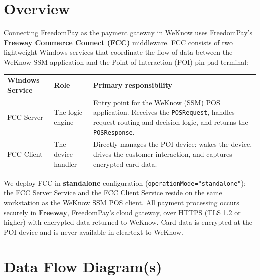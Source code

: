 \documentclass[a4paper,10pt]{article}
\begin{document}
\tableofcontents
\clearpage

\section{Overview}

Connecting FreedomPay as the payment gateway in WeKnow uses FreedomPay's
\textbf{Freeway Commerce Connect (FCC)} middleware. FCC consists of two
lightweight Windows services that coordinate the flow of data between the
WeKnow SSM application and the Point of Interaction (POI) pin-pad
terminal:

\begin{center}
\renewcommand{\arraystretch}{1.3}
\begin{tabularx}{\textwidth}{L{32mm} L{30mm} X}
\color{white}\textbf{Windows Service} &
\color{white}\textbf{Role} & \color{white}\textbf{Primary responsibility}\\
FCC Server & The logic engine &
Entry point for the WeKnow (SSM) POS application. Receives the
\texttt{POSRequest}, handles request routing and decision logic, and
returns the \texttt{POSResponse}.\\
FCC Client & The device handler &
Directly manages the POI device: wakes the device, drives the customer
interaction, and captures encrypted card data.\\
\end{tabularx}
\end{center}

We deploy FCC in \textbf{standalone} configuration
(\texttt{operationMode="standalone"}): the FCC Server Service and the FCC
Client Service reside on the same workstation as the WeKnow SSM POS
client. All payment processing occurs securely in \textbf{Freeway},
FreedomPay's cloud gateway, over HTTPS (TLS 1.2 or higher) with encrypted
data returned to WeKnow. Card data is encrypted at the POI device and is
never available in cleartext to WeKnow.

\section{Data Flow Diagram(s)}
\end{document}

